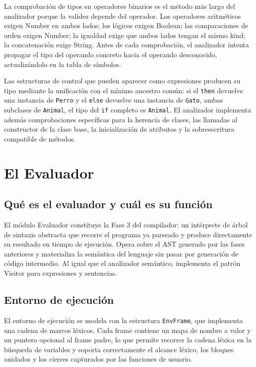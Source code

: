 \documentclass[11pt,a4paper]{article}
\begin{document}
La comprobación de tipos en operadores binarios es el método más largo del analizador porque la validez depende del operador. Los operadores aritméticos exigen Number en ambos lados; los lógicos exigen Boolean; las comparaciones de orden exigen Number; la igualdad exige que ambos lados tengan el mismo kind; la concatenación exige String. Antes de cada comprobación, el analizador intenta propagar el tipo del operando concreto hacia el operando desconocido, actualizándolo en la tabla de símbolos.

Las estructuras de control que pueden aparecer como expresiones producen su tipo mediante la unificación con el mínimo ancestro común: si el \texttt{then} devuelve una instancia de \texttt{Perro} y el \texttt{else} devuelve una instancia de \texttt{Gato}, ambas subclases de \texttt{Animal}, el tipo del \texttt{if} completo es \texttt{Animal}. El analizador implementa además comprobaciones específicas para la herencia de clases, las llamadas al constructor de la clase base, la inicialización de atributos y la sobreescritura compatible de métodos.

\section{El Evaluador}

\subsection{Qué es el evaluador y cuál es su función}

El módulo Evaluador constituye la Fase 3 del compilador: un intérprete de árbol de sintaxis abstracta que recorre el programa ya parseado y produce directamente su resultado en tiempo de ejecución. Opera sobre el AST generado por las fases anteriores y materializa la semántica del lenguaje sin pasar por generación de código intermedio. Al igual que el analizador semántico, implementa el patrón Visitor para expresiones y sentencias.

\subsection{Entorno de ejecución}

El entorno de ejecución se modela con la estructura \texttt{EnvFrame}, que implementa una cadena de marcos léxicos. Cada frame contiene un mapa de nombre a valor y un puntero opcional al frame padre, lo que permite recorrer la cadena léxica en la búsqueda de variables y soporta correctamente el alcance léxico, los bloques anidados y los cierres capturados por las funciones de usuario.
\end{document}

